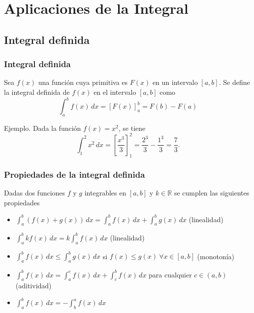 
\section{Aplicaciones de la Integral}



\subsection{Integral definida}
\begin{frame}
	\frametitle{Integral definida}
	\begin{definicion}
		Sea $f(x)$ una función cuya primitiva es $F(x)$ en un intervalo $[a,b]$. Se define la integral definida de $f(x)$ en el intervalo $[a,b]$ como
		\[
			\int_a^b f(x)\,dx = \left[F(x)\right]_a^b=F(b)-F(a)
		\]
	\end{definicion}
	Ejemplo. Dada la función $f(x)=x^2$, se tiene
	\[
		\int_1^2 x^2\,dx = \left[\frac{x^3}{3}\right]_1^2 = \frac{2^3}{3}-\frac{1^3}{3} = \frac{7}{3}.
	\]
\end{frame}


\begin{frame}
	\frametitle{Propiedades de la integral definida}
	Dadas dos funciones $f$ y $g$ integrables en $[a,b]$ y $k \in \mathbb{R}$ se cumplen las siguientes propiedades
	\begin{itemize}
		\item $\int_{a}^{b}(f(x)+g(x))\,dx=\int_{a}^{b}f(x)\,dx+\int_{a}^{b}g(x)\,dx$ (linealidad)
		\item $\int_{a}^{b}{kf(x)}\,dx=k\int_{a}^{b}{f(x)}\,dx$ (linealidad)
		\item $\int_{a}^{b}{f(x)\,dx} \leq \int_{a}^{b}{g(x)\,dx}$ si $f(x)\leq g(x)\ \forall x \in [a,b]$ (monotonía)
		\item $\int_{a}^{b}{f(x)\,dx} = \int_{a}^{c}{f(x)\,dx}+\int_{c}^{b}{f(x)\,dx}$ para cualquier $c\in(a,b)$ (aditividad)
		\item $\int_a^b f(x)\,dx = -\int_b^a f(x)\,dx$
	\end{itemize}
\end{frame}



